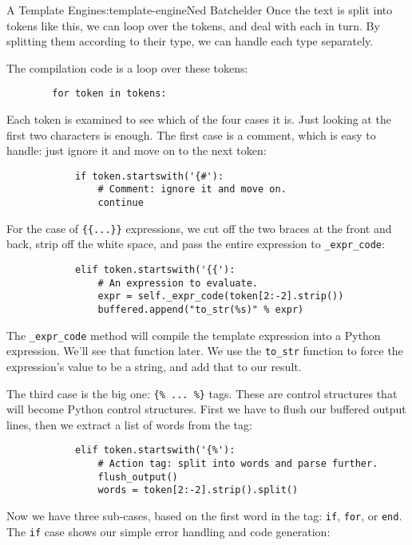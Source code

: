 \begin{aosachapter}{A Template Engine}{s:template-engine}{Ned Batchelder}
Once the text is split into tokens like this, we can loop over the
tokens, and deal with each in turn. By splitting them according to their
type, we can handle each type separately.

The compilation code is a loop over these tokens:

\begin{verbatim}
        for token in tokens:
\end{verbatim}

Each token is examined to see which of the four cases it is. Just
looking at the first two characters is enough. The first case is a
comment, which is easy to handle: just ignore it and move on to the next
token:

\begin{verbatim}
            if token.startswith('{#'):
                # Comment: ignore it and move on.
                continue
\end{verbatim}

For the case of \texttt{\{\{...\}\}} expressions, we cut off the two
braces at the front and back, strip off the white space, and pass the
entire expression to \texttt{\_expr\_code}:

\begin{verbatim}
            elif token.startswith('{{'):
                # An expression to evaluate.
                expr = self._expr_code(token[2:-2].strip())
                buffered.append("to_str(%s)" % expr)
\end{verbatim}

The \texttt{\_expr\_code} method will compile the template expression
into a Python expression. We'll see that function later. We use the
\texttt{to\_str} function to force the expression's value to be a
string, and add that to our result.

The third case is the big one: \texttt{\{\% ... \%\}} tags. These are
control structures that will become Python control structures. First we
have to flush our buffered output lines, then we extract a list of words
from the tag:

\begin{verbatim}
            elif token.startswith('{%'):
                # Action tag: split into words and parse further.
                flush_output()
                words = token[2:-2].strip().split()
\end{verbatim}

Now we have three sub-cases, based on the first word in the tag:
\texttt{if}, \texttt{for}, or \texttt{end}. The \texttt{if} case shows
our simple error handling and code generation:


\end{aosachapter}
